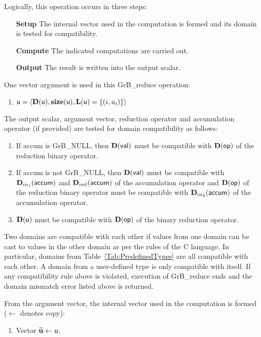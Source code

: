 Logically, this operation occurs in three steps:
\begin{enumerate}[leftmargin=0.85in]
\item[\bf Setup] The internal vector used in the computation is formed 
and its domain is tested for compatibility.
\item[\bf Compute] The indicated computations are carried out.
\item[\bf Output] The result is written into the output scalar.
\end{enumerate}

One vector argument is used in this {\sf GrB\_reduce} operation:
\begin{enumerate}
	\item ${\sf u} = \langle \bold{D}({\sf u}),\bold{size}({\sf u}),
    \bold{L}({\sf u}) = \{(i,u_i) \} \rangle$

\end{enumerate}

The output scalar, argument vector, reduction operator and accumulation 
operator (if provided) are tested for domain compatibility as follows:
\begin{enumerate}

	\item If {\sf accum} is {\sf GrB\_NULL}, then $\bold{D}({\sf val})$ must be
    compatible with $\bold{D}({\sf op})$ of the reduction binary operator.

	\item If {\sf accum} is not {\sf GrB\_NULL}, then $\bold{D}({\sf val})$ must be
    compatible with $\mbox{$\mathbf{D}_{in_{1}}$}({\sf accum})$ and $\mbox{$\mathbf{D}_{out}$}({\sf accum})$ of the accumulation operator and 
    $\bold{D}({\sf op})$ of the reduction binary operator must be compatible with $\mbox{$\mathbf{D}_{in_{2}}$}({\sf accum})$ of the accumulation operator.

	\item $\bold{D}({\sf u})$ must be compatible with $\bold{D}({\sf op})$ of the binary reduction operator.
\end{enumerate}
Two domains are compatible with each other if values from one domain can be cast 
to values in the other domain as per the rules of the C language.
In particular, domains from Table~\ref{Tab:PredefinedTypes} are all compatible 
with each other. A domain from a user-defined type is only compatible with itself.
If any compatibility rule above is violated, execution of {\sf GrB\_reduce} ends and 
the domain mismatch error listed above is returned.

From the argument vector, the internal vector used in 
the computation is formed ($\leftarrow$ denotes copy):
\begin{enumerate}
	\item Vector ${\bf \widetilde{u}} \leftarrow {\sf u}$.
\end{enumerate}

